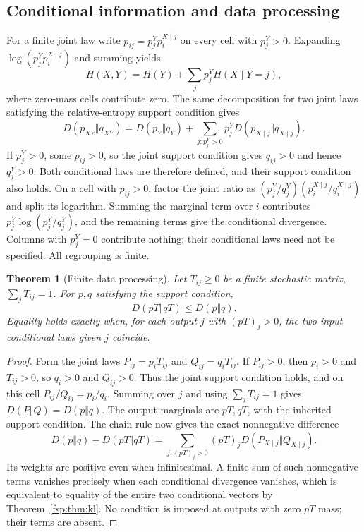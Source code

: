\documentclass[11pt,a4paper]{article}
\numberwithin{equation}{section}
\newtheorem{theorem}{Theorem}[section]
\theoremstyle{definition}
\theoremstyle{remark}
\begin{document}
\subsection{Conditional information and data processing}

For a finite joint law write $p_{ij}=p^Y_jp^{X\mid j}_i$ on every cell
with $p^Y_j>0$. Expanding $\log(p^Y_jp^{X\mid j}_i)$ and summing yields
\begin{equation}
 H(X,Y)=H(Y)+\sum_jp^Y_jH(X\mid Y=j),
\end{equation}
where zero-mass cells contribute zero. The same decomposition for two
joint laws satisfying the relative-entropy support condition gives
\begin{equation}\label{fsp:eq:klchain}
 D(p_{XY}\Vert q_{XY})
 =D(p_Y\Vert q_Y)
 +\sum_{j:p^Y_j>0}p^Y_j
       D(p_{X\mid j}\Vert q_{X\mid j}).
\end{equation}
If $p^Y_j>0$, some $p_{ij}>0$, so the joint support condition gives
$q_{ij}>0$ and hence $q^Y_j>0$. Both conditional laws are therefore
defined, and their support condition also holds. On a cell with
$p_{ij}>0$, factor the joint ratio as
$(p^Y_j/q^Y_j)(p^{X\mid j}_i/q^{X\mid j}_i)$ and split its
logarithm. Summing the marginal term over $i$ contributes
$p^Y_j\log(p^Y_j/q^Y_j)$, and the remaining terms give the conditional
divergence. Columns with $p^Y_j=0$ contribute nothing; their conditional
laws need not be specified. All regrouping is finite.

\begin{theorem}[Finite data processing]\label{fsp:thm:dataprocessing}
Let $T_{ij}\ge0$ be a finite stochastic matrix, $\sum_jT_{ij}=1$.
For $p,q$ satisfying the support condition,
\begin{equation}
 D(pT\Vert qT)\le D(p\Vert q).
\end{equation}
Equality holds exactly when, for each output $j$ with $(pT)_j>0$,
the two input conditional laws given $j$ coincide.
\end{theorem}
\begin{proof}
Form the joint laws $P_{ij}=p_iT_{ij}$ and $Q_{ij}=q_iT_{ij}$.
If $P_{ij}>0$, then $p_i>0$ and $T_{ij}>0$, so $q_i>0$ and
$Q_{ij}>0$. Thus the joint support condition holds, and on this cell
$P_{ij}/Q_{ij}=p_i/q_i$. Summing over $j$ and using
$\sum_jT_{ij}=1$ gives $D(P\Vert Q)=D(p\Vert q)$.
The output marginals are $pT,qT$, with the inherited support condition.
The chain rule now gives the exact nonnegative difference
\[
 D(p\Vert q)-D(pT\Vert qT)
 =\sum_{j:(pT)_j>0}(pT)_j D(P_{X\mid j}\Vert Q_{X\mid j}).
\]
Its weights are positive even when infinitesimal. A finite sum of such
nonnegative terms vanishes precisely when each conditional divergence
vanishes, which is equivalent to equality of the entire two conditional
vectors by Theorem~\ref{fsp:thm:kl}. No condition is imposed at outputs
with zero $pT$ mass; their terms are absent.
\end{proof}
\end{document}
